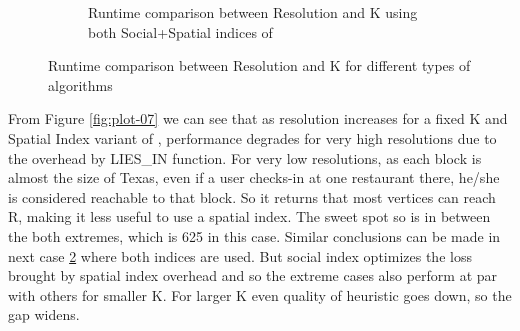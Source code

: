 \begin{figure}[t]
\begin{subfigure}[t]{0.25\textwidth}
		\caption{Runtime comparison between Resolution and K using both Social+Spatial indices of {\rrp}}
		\label{fig:plot-08}
	\end{subfigure}
	\caption{Runtime comparison between Resolution and K for different types of {\rrp} algorithms}
\end{figure}

From Figure \ref{fig:plot-07} we can see that as resolution increases for a fixed K and Spatial Index variant of {\rrp}, performance degrades for very high resolutions due to the overhead by LIES\_IN function. For very low resolutions, as each block is almost the size of Texas, even if a user checks-in at one restaurant there, he/she is considered reachable to that block. So it returns that most vertices can reach R, making it less useful to use a spatial index. The sweet spot so is in between the both extremes, which is 625 in this case. Similar conclusions can be made in next case \ref {fig:plot-08} where both indices are used. But social index optimizes the loss brought by spatial index overhead and so the extreme cases also perform at par with others for smaller K. For larger K even quality of heuristic goes down, so the gap widens.

